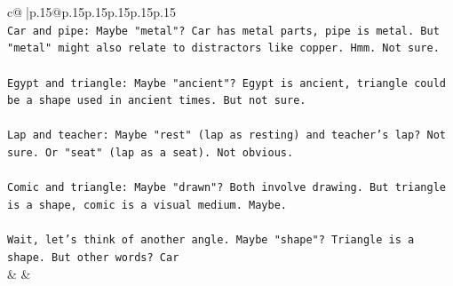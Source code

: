\documentclass{article}
\begin{document}
{\begin{supertabular}{c@{$\;$}|p{.15\linewidth}@{}p{.15\linewidth}p{.15\linewidth}p{.15\linewidth}p{.15\linewidth}p{.15\linewidth}}
{{{\\ 
\texttt{Car and pipe: Maybe "metal"? Car has metal parts, pipe is metal. But "metal" might also relate to distractors like copper. Hmm. Not sure.} \\
\\ 
\texttt{Egypt and triangle: Maybe "ancient"? Egypt is ancient, triangle could be a shape used in ancient times. But not sure.} \\
\\ 
\texttt{Lap and teacher: Maybe "rest" (lap as resting) and teacher's lap? Not sure. Or "seat" (lap as a seat). Not obvious.} \\
\\ 
\texttt{Comic and triangle: Maybe "drawn"? Both involve drawing. But triangle is a shape, comic is a visual medium. Maybe.} \\
\\ 
\texttt{Wait, let's think of another angle. Maybe "shape"? Triangle is a shape. But other words? Car} \\
            }
        }
    }
    & & \\ \\


\end{supertabular}}
\end{document}
